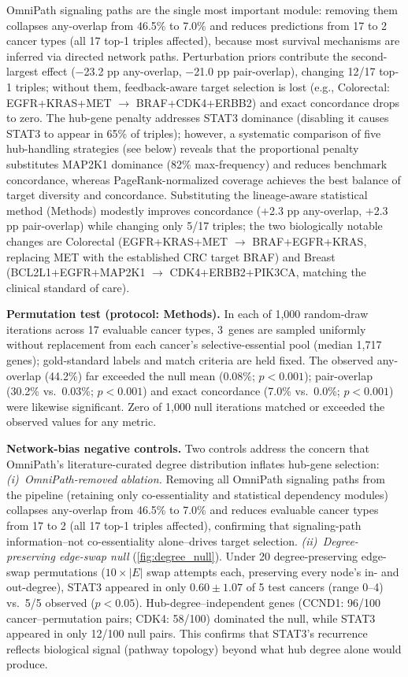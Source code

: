 \documentclass[11pt]{article}
\begin{document}

OmniPath signaling paths are the single most important module: removing them collapses any-overlap from 46.5\% to 7.0\% and reduces predictions from 17 to 2 cancer types (all 17 top-1 triples affected), because most survival mechanisms are inferred via directed network paths. Perturbation priors contribute the second-largest effect ($-$23.2 pp any-overlap, $-$21.0 pp pair-overlap), changing 12/17 top-1 triples; without them, feedback-aware target selection is lost (e.g., Colorectal: EGFR+KRAS+MET $\to$ BRAF+CDK4+ERBB2) and exact concordance drops to zero. The hub-gene penalty addresses STAT3 dominance (disabling it causes STAT3 to appear in 65\% of triples); however, a systematic comparison of five hub-handling strategies (see below) reveals that the proportional penalty substitutes MAP2K1 dominance (82\% max-frequency) and reduces benchmark concordance, whereas PageRank-normalized coverage achieves the best balance of target diversity and concordance. Substituting the lineage-aware statistical method (Methods) modestly improves concordance ($+$2.3 pp any-overlap, $+$2.3 pp pair-overlap) while changing only 5/17 triples; the two biologically notable changes are Colorectal (EGFR+KRAS+MET $\to$ BRAF+EGFR+KRAS, replacing MET with the established CRC target BRAF) and Breast (BCL2L1+EGFR+MAP2K1 $\to$ CDK4+ERBB2+PIK3CA, matching the clinical standard of care).

\textbf{Permutation test (protocol: Methods).} In each of 1{,}000 random-draw iterations across 17 evaluable cancer types, 3~genes are sampled uniformly without replacement from each cancer's selective-essential pool (median 1{,}717 genes); gold-standard labels and match criteria are held fixed. The observed any-overlap (44.2\%) far exceeded the null mean (0.08\%; $p < 0.001$); pair-overlap (30.2\% vs.\ 0.03\%; $p < 0.001$) and exact concordance (7.0\% vs.\ 0.0\%; $p < 0.001$) were likewise significant. Zero of 1{,}000 null iterations matched or exceeded the observed values for any metric.

\textbf{Network-bias negative controls.} Two controls address the concern that OmniPath's literature-curated degree distribution inflates hub-gene selection:
\emph{(i)~OmniPath-removed ablation.} Removing all OmniPath signaling paths from the pipeline (retaining only co-essentiality and statistical dependency modules) collapses any-overlap from 46.5\% to 7.0\% and reduces evaluable cancer types from 17 to 2 (all 17 top-1 triples affected), confirming that signaling-path information--not co-essentiality alone--drives target selection.
\emph{(ii)~Degree-preserving edge-swap null} (\cref{fig:degree_null}). Under 20 degree-preserving edge-swap permutations ($10\times|E|$ swap attempts each, preserving every node's in- and out-degree), STAT3 appeared in only $0.60 \pm 1.07$ of 5 test cancers (range 0--4) vs.\ 5/5 observed ($p < 0.05$). Hub-degree--independent genes (CCND1: 96/100 cancer--permutation pairs; CDK4: 58/100) dominated the null, while STAT3 appeared in only 12/100 null pairs. This confirms that STAT3's recurrence reflects biological signal (pathway topology) beyond what hub degree alone would produce.
\end{document}
